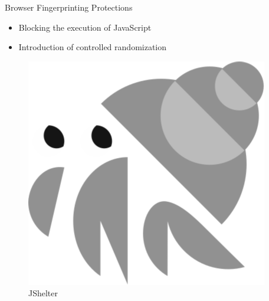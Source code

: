 \documentclass[aspectratio=169]{beamer}
[aspectratio=169] %
\begin{document}
\begin{frame}{Browser Fingerprinting Protections}
  \begin{minipage}{0.49\textwidth} 
    \begin{itemize}
      \item Blocking the execution of JavaScript
      \item Introduction of controlled randomization
    \end{itemize}
  \end{minipage}
  \hfill
  \begin{minipage}{0.49\textwidth} 
    \begin{figure}
      \centering
      \includegraphics[height=0.5\textheight]{figures/jshelter.png}
      \caption{JShelter}
    \end{figure}
  \end{minipage}
\end{frame}
\end{document}
